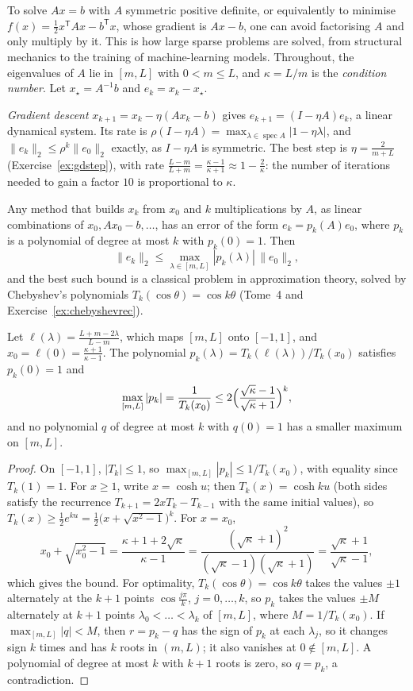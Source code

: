 To solve $Ax=b$ with $A$ symmetric positive definite, or equivalently to minimise $f(x)=\frac12x^{\mathsf T}Ax-b^{\mathsf T}x$, whose gradient
is $Ax-b$, one can avoid factorising $A$ and only multiply by it. This is how large sparse problems are solved, from structural
mechanics to the training of machine-learning models. Throughout, the eigenvalues of $A$ lie in $[m,L]$ with $0<m\le L$, and
$\kappa=L/m$ is the \emph{condition number}. Let $x_\star=A^{-1}b$ and $e_k=x_k-x_\star$.

\emph{Gradient descent} $x_{k+1}=x_k-\eta(Ax_k-b)$ gives $e_{k+1}=(I-\eta A)e_k$, a linear dynamical system. Its rate is
$\rho(I-\eta A)=\max_{\lambda\in\operatorname{spec}A}|1-\eta\lambda|$, and $\|e_k\|_2\le\rho^k\|e_0\|_2$ exactly, as $I-\eta A$ is symmetric.
The best step is $\eta=\frac2{m+L}$ (Exercise~\ref{ex:gdstep}), with rate $\frac{L-m}{L+m}=\frac{\kappa-1}{\kappa+1}\approx1-\frac2\kappa$: the
number of iterations needed to gain a factor $10$ is proportional to $\kappa$.

Any method that builds $x_k$ from $x_0$ and $k$ multiplications by $A$, as linear combinations of $x_0,Ax_0-b,\dots$, has an error of the
form $e_k=p_k(A)e_0$, where $p_k$ is a polynomial of degree at most $k$ with $p_k(0)=1$. Then
\[
\|e_k\|_2\le\max_{\lambda\in[m,L]}|p_k(\lambda)|\,\|e_0\|_2,
\]
and the best such bound is a classical problem in approximation theory, solved by Chebyshev's polynomials $T_k(\cos\theta)=\cos k\theta$
(Tome~4 and Exercise~\ref{ex:chebyshevrec}).

\begin{theorem}\label{thm:chebyshevaccel}
Let $\ell(\lambda)=\frac{L+m-2\lambda}{L-m}$, which maps $[m,L]$ onto $[-1,1]$, and $x_0=\ell(0)=\frac{\kappa+1}{\kappa-1}$. The polynomial
$p_k(\lambda)=T_k(\ell(\lambda))/T_k(x_0)$ satisfies $p_k(0)=1$ and
\[
\max_{[m,L]}|p_k|=\frac1{T_k(x_0)}\le2\Bigl(\frac{\sqrt\kappa-1}{\sqrt\kappa+1}\Bigr)^k,
\]
and no polynomial $q$ of degree at most $k$ with $q(0)=1$ has a smaller maximum on $[m,L]$.
\end{theorem}
\begin{proof}
On $[-1,1]$, $|T_k|\le1$, so $\max_{[m,L]}|p_k|\le1/T_k(x_0)$, with equality since $T_k(1)=1$. For $x\ge1$, write $x=\cosh u$; then
$T_k(x)=\cosh ku$ (both sides satisfy the recurrence $T_{k+1}=2xT_k-T_{k-1}$ with the same initial values), so $T_k(x)\ge\frac12e^{ku}=
\frac12\bigl(x+\sqrt{x^2-1}\bigr)^k$. For $x=x_0$,
\[
x_0+\sqrt{x_0^2-1}=\frac{\kappa+1+2\sqrt\kappa}{\kappa-1}=\frac{(\sqrt\kappa+1)^2}{(\sqrt\kappa-1)(\sqrt\kappa+1)}=\frac{\sqrt\kappa+1}{\sqrt\kappa-1},
\]
which gives the bound. For optimality, $T_k(\cos\theta)=\cos k\theta$ takes the values $\pm1$ alternately at the $k+1$ points $\cos\frac{j\pi}
k$, $j=0,\dots,k$, so $p_k$ takes the values $\pm M$ alternately at $k+1$ points $\lambda_0<\dots<\lambda_k$ of $[m,L]$, where $M=1/T_k(x_0)$.
If $\max_{[m,L]}|q|<M$, then $r=p_k-q$ has the sign of $p_k$ at each $\lambda_j$, so it changes sign $k$ times and has $k$ roots in
$(m,L)$; it also vanishes at $0\notin[m,L]$. A polynomial of degree at most $k$ with $k+1$ roots is zero, so $q=p_k$, a contradiction.
\end{proof}

